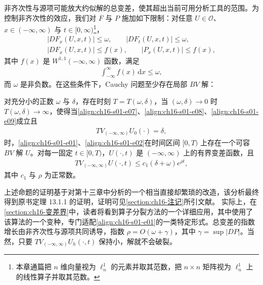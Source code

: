 \documentclass[../../main.tex]{subfiles}
\begin{document}
非齐次性与源项可能放大约似解的总变差，使其超出当前可用分析工具的范围。为控制非齐次性的效应，我们对 $F$ 与 $P$ 施加如下限制：对任意 $U\in\mathscr{O}$、$x\in(-\infty,\infty)$ 与 $t\in[0,\infty)$\footnote{本章通篇把 $n$ 维向量视为 $\ell_n^1$ 的元素并取其范数，把 $n\times n$ 矩阵视为 $\ell_n^1$ 上的线性算子并取其范数。}，
\begin{align}
|DF_x(U,x,t)|\leqslant\omega,\qquad|DF_t(U,x,t)|\leqslant\omega,
\label{align:ch16-s01-e07}\\
|DF_x(U,x,t)|\leqslant f(x),\qquad|P_x(U,x,t)|\leqslant f(x),
\label{align:ch16-s01-e08}
\end{align}
其中 $f(x)$ 是 $W^{1,1}(-\infty,\infty)$ 函数，满足
\begin{align}
\int_{-\infty}^{\infty}f(x)\,\mathrm{d}x\leqslant\omega,
\label{align:ch16-s01-e09}
\end{align}
而 $\omega$ 是非负数。在这些条件下，Cauchy 问题至少存在局部 $BV$ 解：

\begin{theorem}\label{theorem:ch16-1611}
对充分小的正数 $\omega$ 与 $\delta$，存在时刻 $T=T(\omega,\delta)$，当 $(\omega,\delta)\to0$ 时 $T(\omega,\delta)\to\infty$，使得当\eqref{align:ch16-s01-e07}、\eqref{align:ch16-s01-e08}、\eqref{align:ch16-s01-e09}成立且
\begin{align}
TV_{(-\infty,\infty)}U_0(\cdot)=\delta,
\label{align:ch16-s01-e10}
\end{align}
时，\eqref{align:ch16-s01-e01}、\eqref{align:ch16-s01-e02}在时间区间 $[0,T)$ 上存在一个可容 $BV$ 解 $U$。对每一固定 $t\in[0,T)$，$U(\cdot,t)$ 是 $(-\infty,\infty)$ 上的有界变差函数，且
\begin{align}
TV_{(-\infty,\infty)}U(\cdot,t)\leqslant c_1(\delta+\omega)e^{\rho t},
\label{align:ch16-s01-e11}
\end{align}
其中 $c_1$ 与 $\rho$ 为正常数。
\end{theorem}

上述命题的证明基于对第十三章中分析的一个相当直接却繁琐的改造，该分析最终得到原书定理 13.1.1 的证明，证明可见\cref{section:ch16-注记}所引文献。
实际上，在\cref{section:ch16-变差界}中，读者将看到算子分裂方法的一个详细应用，其中使用了该算法的一个变种，专门适配\eqref{align:ch16-s01-e01}的一类特定形式。总变差的指数增长由非齐次性与源项共同诱导，指数 $\rho=O(\omega+\gamma)$，其中 $\gamma=\sup|DP|$。当然，只要 $TV_{(-\infty,\infty)}U_h(\cdot,t)$ 保持小，解就不会破裂。
\end{document}
